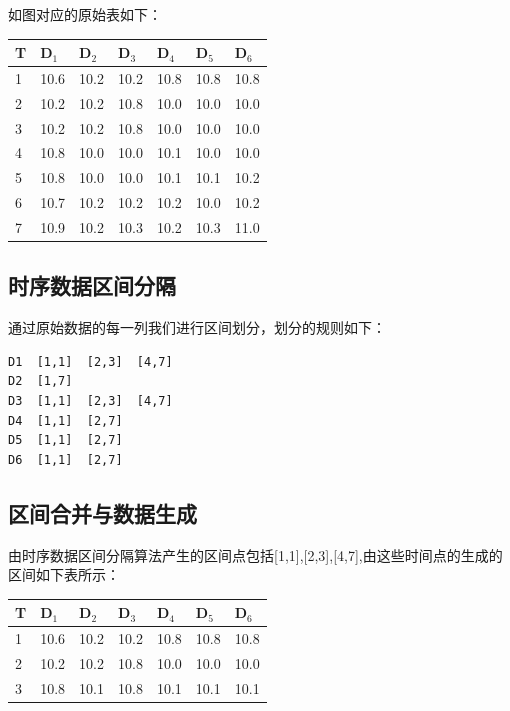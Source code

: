 如图对应的原始表如下：

\begin{center}
  \begin{tabular}{ | p{1.5cm} | p{1.5cm} | p{1.5cm} | p{1.5cm} | p{1.5cm} | p{1.5cm}|p{1.5cm}}
    \hline
    T  & D$_{1}$ & D$_{2}$ & D$_{3}$ & D$_{4}$  & D$_{5}$ &  D$_{6}$  \\ \hline
    1  & 10.6     & 10.2     & 10.2     & 10.8  &10.8     &   10.8     \\ \hline
    2  &10.2      &10.2      &10.8      &10.0   &10.0     &   10.0     \\  \hline
    3  &10.2      &10.2      &10.8      &10.0   &10.0     &   10.0      \\ \hline
    4 &10.8      &10.0      &10.0      &10.1    &10.0     &   10.0   \\ \hline
    5 &10.8      &10.0      &10.0      &10.1    &10.1     &   10.2    \\ \hline
    6 &10.7      &10.2      &10.2      &10.2    &10.0     &   10.2    \\ \hline
    7 &10.9      &10.2      &10.3      &10.2    &10.3     &   11.0     \\ \hline
    \hline
  \end{tabular}
\end{center}


\subsection{时序数据区间分隔}
\label{5.22}
通过原始数据的每一列我们进行区间划分，划分的规则如下：

\begin{lstlisting}
D1  [1,1]  [2,3]  [4,7]
D2  [1,7]
D3  [1,1]  [2,3]  [4,7]
D4  [1,1]  [2,7]
D5  [1,1]  [2,7]  
D6  [1,1]  [2,7]
\end{lstlisting}


\subsection{区间合并与数据生成}
\label{5.23}
由时序数据区间分隔算法产生的区间点包括[1,1],[2,3],[4,7],由这些时间点的生成的区间如下表所示：

\begin{center}
  \begin{tabular}{ | p{1.5cm} | p{1.5cm} | p{1.5cm} | p{1.5cm} | p{1.5cm} | p{1.5cm}|p{1.5cm}}
    \hline
    T  & D$_{1}$ & D$_{2}$ & D$_{3}$ & D$_{4}$  & D$_{5}$ &  D$_{6}$  \\ \hline
    1  & 10.6     & 10.2     & 10.2     & 10.8  &10.8     &   10.8     \\ \hline
    2  &10.2      &10.2      &10.8      &10.0   &10.0     &   10.0     \\  \hline
    3  &10.8      &10.1      &10.8      &10.1   &10.1     &   10.1      \\ \hline
    \hline
  \end{tabular}
\end{center}

